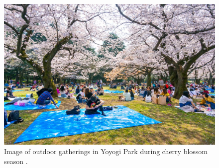 
 \begin{figure}[h!]
  \centering
  \includegraphics[width=1.0\textwidth]{images/gatherings/yoyogi3.jpeg}
  \captionsetup{width=1.0\linewidth}
  \caption[Yoyogi Park - cherry blossoms]{Image of outdoor gatherings in Yoyogi Park during cherry blossom season \cite{jrailpass_yoyogi_2019}.}
  \label{fig:yoyogi_park_cherry}
\end{figure}

